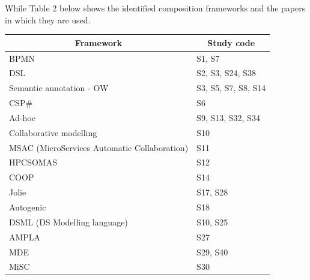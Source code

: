 \documentclass{article}
\begin{document}
\begin{multicols}{2}
While Table 2 below shows the identified composition frameworks and the papers in which they are used.

\begin{table}[ht!]
\begin{center}
\scriptsize
\begin{tabular}{ | m{20em} | m{20em} | }
\hline
\multicolumn{1}{|c|}{\textbf{Framework}}     & \multicolumn{1}{c|}{\textbf{Study   code}} \\ \hline
BPMN                                         & S1,   S7                                   \\ \hline
DSL                                          & S2,   S3, S24, S38                         \\ \hline
Semantic   annotation - OW                   & S3,   S5, S7, S8, S14                      \\ \hline
CSP\#                                        & S6                                         \\ \hline
Ad-hoc                                       & S9,   S13, S32, S34                        \\ \hline
Collaborative   modelling                    & S10                                        \\ \hline
MSAC (MicroServices Automatic Collaboration) & S11                                        \\ \hline
HPCSOMAS                                     & S12                                        \\ \hline
COOP                                         & S14                                        \\ \hline
Jolie                                        & S17,   S28                                 \\ \hline
Autogenic                                    & S18                                        \\ \hline
DSML (DS Modelling language)                 & S10,   S25                                 \\ \hline
AMPLA                                        & S27                                        \\ \hline
MDE                                          & S29,   S40                                 \\ \hline
MiSC                                         & S30                                        \\ \hline

\end{tabular}
\end{center}
\end{table}
\end{multicols}
\end{document}
